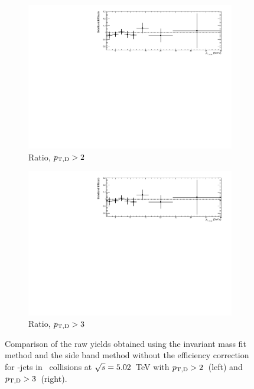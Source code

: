 \begin{figure}[bth]
\begin{subfigure}[c]{0.45\textwidth}
\includegraphics[width=\textwidth]{pPbplots/methodsComparison/DjetSpectraRatio_FASTwoSDD_noEff_ptD2}
\caption{Ratio, $p_{\mathrm{T,D}}>2$~\GeVc}
\end{subfigure}
\begin{subfigure}[d]{0.45\textwidth}
\includegraphics[width=\textwidth]{pPbplots/methodsComparison/DjetSpectraRatio_FASTwoSDD_noEff_ptD3}
\caption{Ratio, $p_{\mathrm{T,D}}>3$~\GeVc}
\end{subfigure}
\caption{Comparison of the raw yields obtained using the invariant mass fit method and the side band method without the efficiency correction for \Dstar-jets in \pPb\ collisions at $\sqrt{s}=5.02$~TeV with $p_{\mathrm{T,D}}>2$~\GeVc (left) and $p_{\mathrm{T,D}}>3$~\GeVc (right).}
\label{fig:pPbCompInvMassFitSB_beforeEff}
\end{figure}


